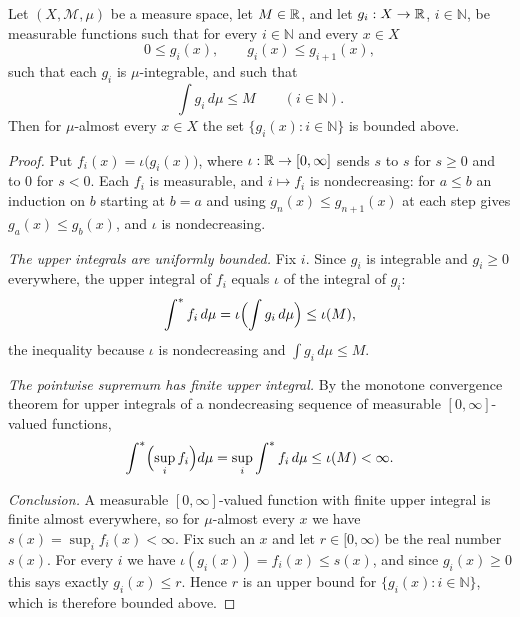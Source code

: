 \begin{helper}
Let $(X,\mathcal M,\mu)$ be a measure space, let $M\in\mathbb{R}$, and let
$g_i:X\to\mathbb{R}$, $i\in\mathbb N$, be measurable functions such that for every
$i\in\mathbb N$ and every $x\in X$
\[
  0\le g_i(x),\qquad g_i(x)\le g_{i+1}(x),
\]
such that each $g_i$ is $\mu$-integrable, and such that
\[
  \int g_i\,d\mu\le M\qquad(i\in\mathbb N).
\]
Then for $\mu$-almost every $x\in X$ the set $\{g_i(x):i\in\mathbb N\}$ is
bounded above.
\end{helper}
\begin{proof}
Put $f_i(x)=\iota\bigl(g_i(x)\bigr)$, where $\iota:\mathbb{R}\to[0,\infty]$ sends $s$
to $s$ for $s\ge0$ and to $0$ for $s<0$. Each $f_i$ is measurable, and
$i\mapsto f_i$ is nondecreasing: for $a\le b$ an induction on $b$ starting at
$b=a$ and using $g_n(x)\le g_{n+1}(x)$ at each step gives
$g_a(x)\le g_b(x)$, and $\iota$ is nondecreasing.

\emph{The upper integrals are uniformly bounded.} Fix $i$. Since $g_i$ is
integrable and $g_i\ge0$ everywhere, the upper integral of $f_i$ equals
$\iota$ of the integral of $g_i$:
\[
  \int^{*}f_i\,d\mu=\iota\Bigl(\int g_i\,d\mu\Bigr)\le\iota(M),
\]
the inequality because $\iota$ is nondecreasing and $\int g_i\,d\mu\le M$.

\emph{The pointwise supremum has finite upper integral.} By the monotone
convergence theorem for upper integrals of a nondecreasing sequence of
measurable $[0,\infty]$-valued functions,
\[
  \int^{*}\Bigl(\sup_if_i\Bigr)d\mu=\sup_i\int^{*}f_i\,d\mu\le\iota(M)<\infty .
\]

\emph{Conclusion.} A measurable $[0,\infty]$-valued function with finite upper
integral is finite almost everywhere, so for $\mu$-almost every $x$ we have
$s(x)=\sup_if_i(x)<\infty$. Fix such an $x$ and let $r\in[0,\infty)$ be the real
number $s(x)$. For every $i$ we have $\iota(g_i(x))=f_i(x)\le s(x)$, and since
$g_i(x)\ge0$ this says exactly $g_i(x)\le r$. Hence $r$ is an upper bound for
$\{g_i(x):i\in\mathbb N\}$, which is therefore bounded above.
\end{proof}
